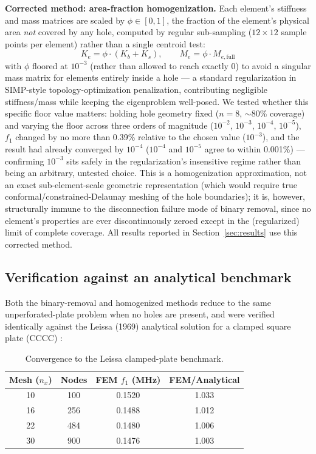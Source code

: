 \documentclass[11pt]{article}
\begin{document}
\textbf{Corrected method: area-fraction homogenization.} Each element's stiffness and mass matrices are scaled by $\phi \in [0,1]$, the fraction of the element's physical area \textit{not} covered by any hole, computed by regular sub-sampling ($12\times12$ sample points per element) rather than a single centroid test:
\[
K_e = \phi \cdot (K_b + K_s), \qquad M_e = \phi \cdot M_{e,\text{full}}
\]
with $\phi$ floored at $10^{-3}$ (rather than allowed to reach exactly 0) to avoid a singular mass matrix for elements entirely inside a hole --- a standard regularization in SIMP-style topology-optimization penalization, contributing negligible stiffness/mass while keeping the eigenproblem well-posed. We tested whether this specific floor value matters: holding hole geometry fixed ($n=8$, $\sim$80\% coverage) and varying the floor across three orders of magnitude ($10^{-2}$, $10^{-3}$, $10^{-4}$, $10^{-5}$), $f_1$ changed by no more than 0.39\% relative to the chosen value ($10^{-3}$), and the result had already converged by $10^{-4}$ ($10^{-4}$ and $10^{-5}$ agree to within 0.001\%) --- confirming $10^{-3}$ sits safely in the regularization's insensitive regime rather than being an arbitrary, untested choice. This is a homogenization approximation, not an exact sub-element-scale geometric representation (which would require true conformal/constrained-Delaunay meshing of the hole boundaries); it is, however, structurally immune to the disconnection failure mode of binary removal, since no element's properties are ever discontinuously zeroed except in the (regularized) limit of complete coverage. All results reported in Section~\ref{sec:results} use this corrected method.

\subsection{Verification against an analytical benchmark}

Both the binary-removal and homogenized methods reduce to the same unperforated-plate problem when no holes are present, and were verified identically against the Leissa (1969) analytical solution for a clamped square plate (CCCC) \cite{leissa1969}:

\begin{table}[h]
\centering
\caption{Convergence to the Leissa clamped-plate benchmark.}
\begin{tabular}{cccc}
\toprule
Mesh ($n_x$) & Nodes & FEM $f_1$ (MHz) & FEM/Analytical \\
\midrule
10 & 100 & 0.1520 & 1.033 \\
16 & 256 & 0.1488 & 1.012 \\
22 & 484 & 0.1480 & 1.006 \\
30 & 900 & 0.1476 & 1.003 \\
\bottomrule
\end{tabular}
\end{table}
\end{document}
